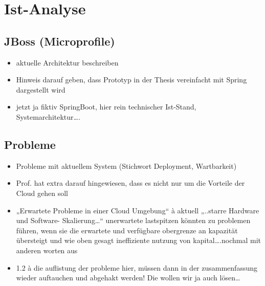 \chapter{Ist-Analyse}

\section{JBoss (Microprofile)}
\begin{itemize}
  \item aktuelle Architektur beschreiben
  \item Hinweis darauf geben, dass Prototyp in der Thesis vereinfacht mit Spring dargestellt wird
  \item jetzt ja fiktiv SpringBoot, hier rein technischer Ist-Stand, Systemarchitektur….
\end{itemize}

\section{Probleme}
\begin{itemize}
  \item Probleme mit aktuellem System (Stichwort Deployment, Wartbarkeit)
  \item Prof. hat extra darauf hingewiesen, dass es nicht nur um die Vorteile der Cloud gehen soll
  \item „Erwartete Probleme in einer Cloud Umgebung“ à aktuell „..starre Hardware und Software- Skalierung…“ unerwartete lastspitzen könnten zu problemen führen, wenn sie die erwartete und verfügbare obergrenze an kapazität übersteigt und wie oben gesagt ineffiziente nutzung von kapital….nochmal mit anderen worten aus 
  \item  1.2 à die auflistung der probleme hier, müssen dann in der zusammenfassung wieder auftauchen und abgehakt werden! Die wollen wir ja auch lösen…
\end{itemize}
